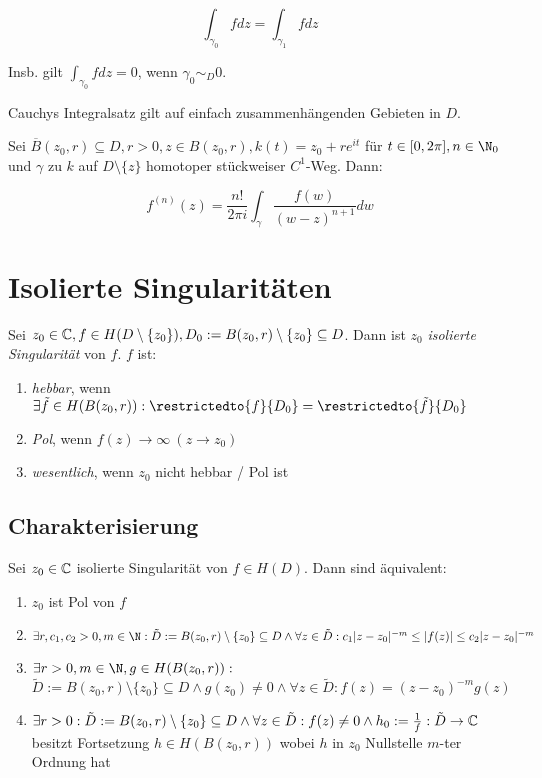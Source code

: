 $$\int_{\gamma_0} f dz = \int_{\gamma_1} f dz$$

Insb. gilt $\int_{\gamma_0} f dz = 0$, wenn $\gamma_0 \sim_D 0$.

Cauchys Integralsatz gilt auf einfach zusammenhängenden Gebieten in $D$.

\spacing

Sei $\overline B(z_0,r) \subseteq D, r > 0, z \in B(z_0,r), k(t) = z_0 + re^{it}$ für $t \in [0, 2\pi], n \in \N_0$ und $\gamma$ zu $k$ auf $D \setminus \{z\}$ homotoper stückweiser $C^1$-Weg. Dann:

$$f^{(n)}(z) = \frac{n!}{2\pi i} \int_\gamma \frac{f(w)}{(w-z)^{n+1}} dw$$

\section*{Isolierte Singularitäten}

Sei $z_0 \in \mathbb{C}, f \in H(D \setminus \{z_0\}), D_0 := B(z_0,r) \setminus \{z_0\} \subseteq D$. Dann ist $z_0$ \emph{isolierte Singularität} von $f$. $f$ ist:

\begin{enumerate}[label=(\alph*)]
	\item \emph{hebbar}, wenn $\exists \tilde f \in H(B(z_0,r)) : \restrictedto{f}{D_0} = \restrictedto{\tilde f}{D_0}$
	\item \emph{Pol}, wenn $f(z) \to \infty \ (z \to z_0)$
	\item \emph{wesentlich}, wenn $z_0$ nicht hebbar / Pol ist
\end{enumerate}

\subsection*{Charakterisierung}

Sei $z_0 \in \mathbb{C}$ isolierte Singularität von $f \in H(D)$. Dann sind äquivalent:

\begin{enumerate}[label=(\alph*)]
	\item $z_0$ ist Pol von $f$
	\item $\exists r, c_1, c_2 > 0, m \in \N : \tilde D := B(z_0,r) \setminus \{z_0\} \subseteq D \land \forall z \in \tilde D : c_1|z-z_0|^{-m} \leq |f(z)| \leq c_2|z-z_0|^{-m}$
	\item $\exists r > 0, m \in \N, g \in H(B(z_0,r)) :$ \\ $\tilde D := B(z_0,r) \setminus \{z_0\} \subseteq D \land g(z_0) \neq 0 \land \forall z \in \tilde D : f(z) = (z-z_0)^{-m}g(z)$
	\item $\exists r > 0 : \tilde D := B(z_0,r) \setminus \{z_0\} \subseteq D \land \forall z \in \tilde D : f(z) \neq 0 \land h_0 := \frac{1}{f} : \tilde D \to \mathbb{C}$ besitzt Fortsetzung $h \in H(B(z_0,r))$ wobei $h$ in $z_0$ Nullstelle $m$-ter Ordnung hat
\end{enumerate}

